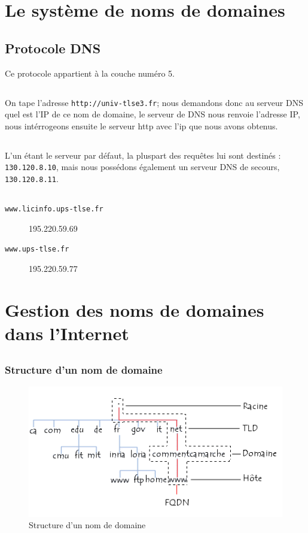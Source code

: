 \documentclass[a4paper, 11pt]{article}
\begin{document}
	\maketitle
	\section{Le système de noms de domaines}
	\subsection{Protocole DNS}
	Ce protocole appartient à la couche numéro 5.
	\subsection{}
	On tape l'adresse \texttt{http://univ-tlse3.fr}; nous demandons donc au serveur DNS quel est l'IP de ce nom de domaine, le serveur de DNS nous
	renvoie l'adresse IP, nous intérrogeons ensuite le serveur http avec l'ip que nous avons obtenus.
	\subsection{}
		L'un étant le serveur par défaut, la pluspart des requêtes lui sont destinés : \texttt{130.120.8.10}, mais nous possédons également un serveur DNS de
		secours, \texttt{130.120.8.11}.
		\subsection{}
		\begin{description}
			\item[\texttt{www.licinfo.ups-tlse.fr}] 195.220.59.69
			\item[\texttt{www.ups-tlse.fr}] 195.220.59.77
		\end{description}
	\section{Gestion des noms de domaines dans l'Internet}
	\subsection{}
	\subsubsection{Structure d'un nom de domaine}
	\begin{figure}[H]
		\centering
		\includegraphics[width=12cm]{structNdd.png}
		\caption{Structure d'un nom de domaine}
	\end{figure}
\end{document}
